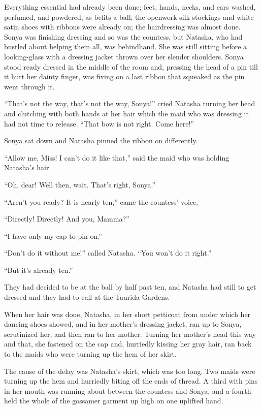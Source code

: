 Everything essential had already been done; feet, hands, necks,
and ears washed, perfumed, and powdered, as befits a ball; the
openwork silk stockings and white satin shoes with ribbons were
already on; the hairdressing was almost done. Sonya was finishing
dressing and so was the countess, but Natasha, who had bustled
about helping them all, was behindhand. She was still sitting
before a looking-glass with a dressing jacket thrown over her
slender shoulders. Sonya stood ready dressed in the middle of the
room and, pressing the head of a pin till it hurt her dainty
finger, was fixing on a last ribbon that squeaked as the pin went
through it.

``That's not the way, that's not the way, Sonya!'' cried Natasha
turning her head and clutching with both hands at her hair which
the maid who was dressing it had not time to release. ``That bow
is not right. Come here!''

Sonya sat down and Natasha pinned the ribbon on differently.

``Allow me, Miss! I can't do it like that,'' said the maid who
was holding Natasha's hair.

``Oh, dear! Well then, wait. That's right, Sonya.''

``Aren't you ready? It is nearly ten,'' came the countess' voice.

``Directly! Directly! And you, Mamma?''

``I have only my cap to pin on.''

``Don't do it without me!'' called Natasha. ``You won't do it
right.''

``But it's already ten.''

They had decided to be at the ball by half past ten, and Natasha
had still to get dressed and they had to call at the Taurida
Gardens.

When her hair was done, Natasha, in her short petticoat from
under which her dancing shoes showed, and in her mother's
dressing jacket, ran up to Sonya, scrutinized her, and then ran
to her mother. Turning her mother's head this way and that, she
fastened on the cap and, hurriedly kissing her gray hair, ran
back to the maids who were turning up the hem of her skirt.

The cause of the delay was Natasha's skirt, which was too
long. Two maids were turning up the hem and hurriedly biting off
the ends of thread. A third with pins in her mouth was running
about between the countess and Sonya, and a fourth held the whole
of the gossamer garment up high on one uplifted hand.

